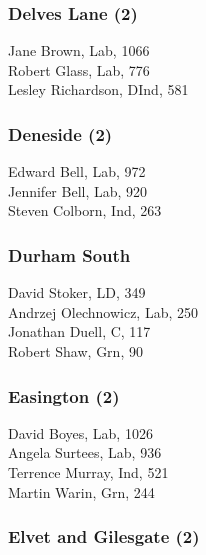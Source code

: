 \documentclass[a4paper,openany,10pt]{book}
\begin{document}
\subsubsection*{Delves Lane (2)}



Jane Brown, Lab, 1066\\
Robert Glass, Lab, 776\\
Lesley Richardson, DInd, 581\\


\subsubsection*{Deneside (2)}



Edward Bell, Lab, 972\\
Jennifer Bell, Lab, 920\\
Steven Colborn, Ind, 263\\


\subsubsection*{Durham South}



David Stoker, LD, 349\\
Andrzej Olechnowicz, Lab, 250\\
Jonathan Duell, C, 117\\
Robert Shaw, Grn, 90\\


\subsubsection*{Easington (2)}



David Boyes, Lab, 1026\\
Angela Surtees, Lab, 936\\
Terrence Murray, Ind, 521\\
Martin Warin, Grn, 244\\


\subsubsection*{Elvet and Gilesgate (2)}
\end{document}

